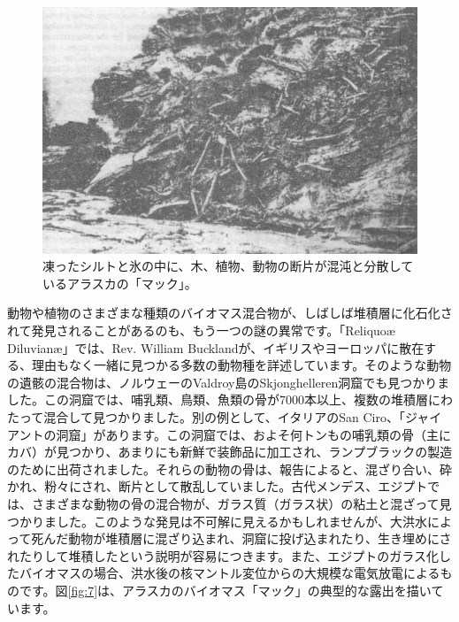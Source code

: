 \documentclass[10pt,twocolumn,letterpaper]{article}
\begin{document}
\begin{figure}[b]
\begin{center}
   \includegraphics[width=1\linewidth]{muck-crop.jpeg}
\end{center}
   \caption{凍ったシルトと氷の中に、木、植物、動物の断片が混沌と分散しているアラスカの「マック」\cite{146}。}
\label{fig:7}
\label{fig:onecol}
\end{figure}

動物や植物のさまざまな種類のバイオマス混合物が、しばしば堆積層に化石化されて発見されることがあるのも、もう一つの謎の異常です。「Reliquoæ Diluvianæ」では、Rev. William Bucklandが、イギリスやヨーロッパに散在する、理由もなく一緒に見つかる多数の動物種を詳述しています\cite{58}。そのような動物の遺骸の混合物は、ノルウェーのValdroy島のSkjonghelleren洞窟でも見つかりました。この洞窟では、哺乳類、鳥類、魚類の骨が7000本以上、複数の堆積層にわたって混合して見つかりました\cite{59}。別の例として、イタリアのSan Ciro、「ジャイアントの洞窟」があります。この洞窟では、およそ何トンもの哺乳類の骨（主にカバ）が見つかり、あまりにも新鮮で装飾品に加工され、ランプブラックの製造のために出荷されました。それらの動物の骨は、報告によると、混ざり合い、砕かれ、粉々にされ、断片として散乱していました\cite{60,61}。古代メンデス、エジプトでは、さまざまな動物の骨の混合物が、ガラス質（ガラス状）の粘土と混ざって見つかりました\cite{57}。このような発見は不可解に見えるかもしれませんが、大洪水によって死んだ動物が堆積層に混ざり込まれ、洞窟に投げ込まれたり、生き埋めにされたりして堆積したという説明が容易につきます。また、エジプトのガラス化したバイオマスの場合、洪水後の核マントル変位からの大規模な電気放電によるものです。図\ref{fig:7}は、アラスカのバイオマス「マック」の典型的な露出を描いています\cite{56}。
\end{document}
